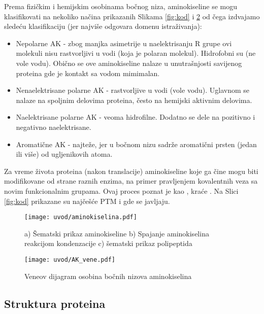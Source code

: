 Prema fizičkim i hemijskim osobinama bočnog niza, aminokiseline se mogu
klasifikovati na nekoliko načina prikazanih Slikama \ref{fig:kod} i
\ref{fig:AK_vene} od čega izdvajamo sledeću klasifikaciju (jer najviše odgovara domenu istraživanja):
\begin{itemize}
  \item Nepolarne AK -
    zbog manjka asimetrije u naelektrisanju R grupe ovi molekuli nisu
    rastvorljivi u vodi (koja je polaran molekul). Hidrofobni su (ne vole
    vodu).  Obično se ove aminokiseline nalaze u unutrašnjosti savijenog proteina gde
    je kontakt sa vodom mimimalan.
    
  \item Nenaelektrisane polarne AK -
    rastvorljive u vodi (vole vodu). Uglavnom se nalaze na spoljnim
    delovima proteina, često na hemijski aktivnim delovima.

  \item Naelektrisane polarne AK -
    veoma hidrofilne. Dodatno se dele na pozitivno i negativno naelektrisane.

  \item Aromatične AK - najteže, jer u bočnom nizu sadrže 
    aromatični prsten (jedan ili više) od ugljenikovih atoma.
\end{itemize}

Za vreme života proteina (nakon translacije) aminokiseline koje ga čine mogu
biti modifikovane od strane raznih enzima, na primer pravljenjem kovalentnih
veza sa novim funkcionalnim grupama. Ovaj proces poznat je kao
, kraće .  Na Slici
\ref{fig:kod} prikazane su najčešće PTM i gde se javljaju.

\begin{figure}[th]
\centering
\texttt{[image: uvod/aminokiselina.pdf]}
\caption {a) Šematski prikaz aminokiseline
b) Spajanje aminokiselina reakcijom kondenzacije
c) šematski prikaz polipeptida
}
\label{fig:AK}
\end{figure}


\begin{figure}[th]
\centering
\texttt{[image: uvod/AK\_vene.pdf]}
\caption {Veneov dijagram osobina bočnih nizova aminokiselina}
\label{fig:AK_vene}
\end{figure}

\clearpage


\subsection{Struktura proteina}

